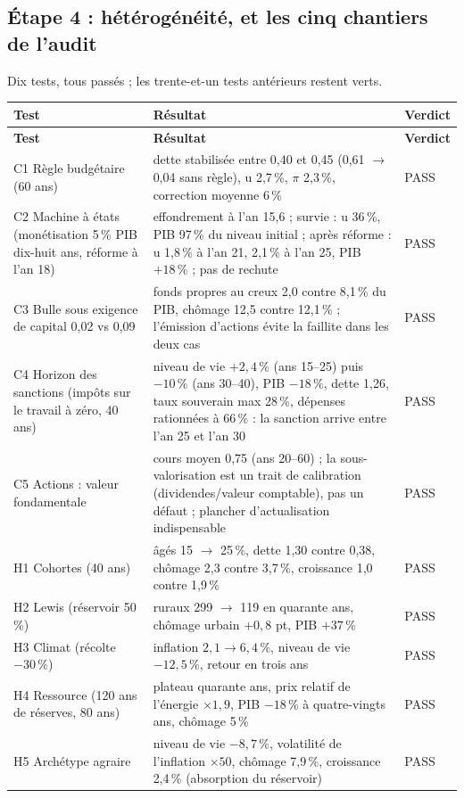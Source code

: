 \documentclass[11pt,a4paper]{article}
\begin{document}
\subsection{Étape 4 : hétérogénéité, et les cinq chantiers de l'audit}
\label{sec:proto4}
Dix tests, tous passés ; les trente-et-un tests antérieurs restent verts.
\begin{center}\small
\begin{longtable}{p{4.4cm}p{8.0cm}p{1.4cm}}
\toprule
\textbf{Test} & \textbf{Résultat} & \textbf{Verdict}\\
\midrule
\endfirsthead
\toprule
\textbf{Test} & \textbf{Résultat} & \textbf{Verdict}\\
\midrule
\endhead
C1 Règle budgétaire (60 ans) & dette stabilisée entre 0,40 et 0,45 (0,61 $\to$ 0,04 sans règle), u 2,7\,\%, $\pi$ 2,3\,\%, correction moyenne 6\,\% & PASS\\
C2 Machine à états (monétisation 5\,\% PIB dix-huit ans, réforme à l'an 18) & effondrement à l'an 15,6 ; survie : u 36\,\%, PIB 97\,\% du niveau initial ; après réforme : u 1,8\,\% à l'an 21, 2,1\,\% à l'an 25, PIB $+18\,\%$ ; pas de rechute & PASS\\
C3 Bulle sous exigence de capital 0,02 vs 0,09 & fonds propres au creux 2,0 contre 8,1\,\% du PIB, chômage 12,5 contre 12,1\,\% ; l'émission d'actions évite la faillite dans les deux cas & PASS\\
C4 Horizon des sanctions (impôts sur le travail à zéro, 40 ans) & niveau de vie $+2{,}4\,\%$ (ans 15--25) puis $-10\,\%$ (ans 30--40), PIB $-18\,\%$, dette 1,26, taux souverain max 28\,\%, dépenses rationnées à 66\,\% : la sanction arrive entre l'an 25 et l'an 30 & PASS\\
C5 Actions : valeur fondamentale & cours moyen 0,75 (ans 20--60) ; la sous-valorisation est un trait de calibration (dividendes/valeur comptable), pas un défaut ; plancher d'actualisation indispensable & PASS\\
H1 Cohortes (40 ans) & âgés 15 $\to$ 25\,\%, dette 1,30 contre 0,38, chômage 2,3 contre 3,7\,\%, croissance 1,0 contre 1,9\,\% & PASS\\
H2 Lewis (réservoir 50\,\%) & ruraux 299 $\to$ 119 en quarante ans, chômage urbain $+0{,}8$ pt, PIB $+37\,\%$ & PASS\\
H3 Climat (récolte $-30\,\%$) & inflation $2{,}1\to6{,}4\,\%$, niveau de vie $-12{,}5\,\%$, retour en trois ans & PASS\\
H4 Ressource (120 ans de réserves, 80 ans) & plateau quarante ans, prix relatif de l'énergie $\times1{,}9$, PIB $-18\,\%$ à quatre-vingts ans, chômage 5\,\% & PASS\\
H5 Archétype agraire & niveau de vie $-8{,}7\,\%$, volatilité de l'inflation $\times50$, chômage 7,9\,\%, croissance 2,4\,\% (absorption du réservoir) & PASS\\
\bottomrule
\end{longtable}
\end{center}
\end{document}
